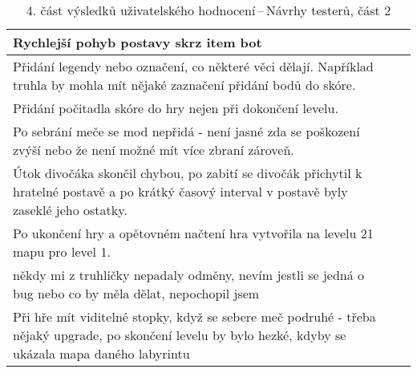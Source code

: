 \begin{table}[htbp]
\begin{tabularx}{\textwidth}{|X|X|X|}
Rychlejší pohyb postavy skrz item bot \\ \hline

Přidání legendy nebo označení, co některé věci dělají. Například truhla by mohla mít nějaké zaznačení přidání bodů do skóre.\\ 
Přidání počitadla skóre do hry nejen při dokončení levelu.\\ 
Po sebrání meče se mod nepřidá - není jasné zda se poškození zvýší nebo že není možné mít více zbraní zároveň. \\ 
Útok divočáka skončil chybou, po zabití se divočák přichytil k hratelné postavě a po krátký časový interval v postavě byly zaseklé jeho ostatky.\\ 
Po ukončení hry a opětovném načtení hra vytvořila na levelu 21 mapu pro level 1.\\ \hline

někdy mi z truhličky nepadaly odměny, nevím jestli se jedná o bug nebo co by měla dělat, nepochopil jsem\\ \hline

Při hře mít  viditelné stopky, když se sebere meč podruhé - třeba nějaký upgrade, po skončení levelu by bylo hezké, kdyby se ukázala mapa daného labyrintu \\ \hline

\end{tabularx}
\caption{4. část výsledků uživatelského hodnocení\,--\,Návrhy testerů, část 2}
\end{table}


%
